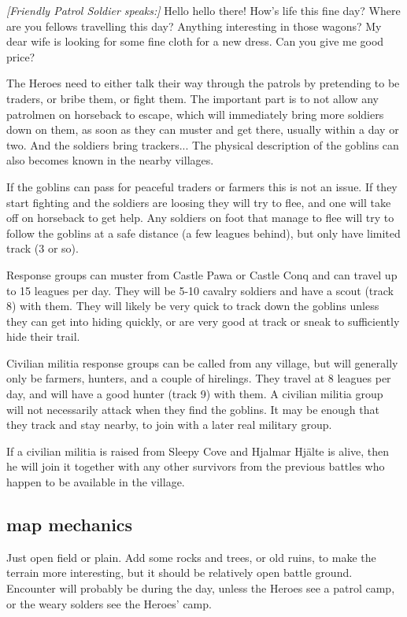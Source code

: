 \begin{readoutloud}
\emph{[Friendly Patrol Soldier speaks:]}
Hello hello there! How's life this fine day? Where are you fellows travelling this day? Anything interesting in those wagons? My dear wife is looking for some fine cloth for a new dress. Can you give me good price?
\end{readoutloud}

\noindent The Heroes need to either talk their way through the patrols by pretending to be traders, or bribe them, or fight them. The important part is to not allow any patrolmen on horseback to escape, which will immediately bring more soldiers down on them, as soon as they can muster and get there, usually within a day or two. And the soldiers bring trackers... The physical description of the goblins can also becomes known in the nearby villages.

If the goblins can pass for peaceful traders or farmers this is not an issue. If they start fighting and the soldiers are loosing they will try to flee, and one will take off on horseback to get help. Any soldiers on foot that manage to flee will try to follow the goblins at a safe distance (a few leagues behind), but only have limited track (3 or so).

Response groups can muster from Castle Pawa or Castle Conq and can travel up to 15 leagues per day. They will be 5-10 cavalry soldiers and have a scout (track 8) with them. They will likely be very quick to track down the goblins unless they can get into hiding quickly, or are very good at track or sneak to sufficiently hide their trail.

Civilian militia response groups can be called from any village, but will generally only be farmers, hunters, and a couple of hirelings. They travel at 8 leagues per day, and will have a good hunter (track 9) with them. A civilian militia group will not necessarily attack when they find the goblins. It may be enough that they track and stay nearby, to join with a later real military group.

If a civilian militia is raised from Sleepy Cove and Hjalmar Hjälte is alive, then he will join it together with any other survivors from the previous battles who happen to be available in the village.


\subsection*{map mechanics}

Just open field or plain. Add some rocks and trees, or old ruins, to make the terrain more interesting, but it should be relatively open battle ground.
Encounter will probably be during the day, unless the Heroes see a patrol camp, or the weary solders see the Heroes' camp.



